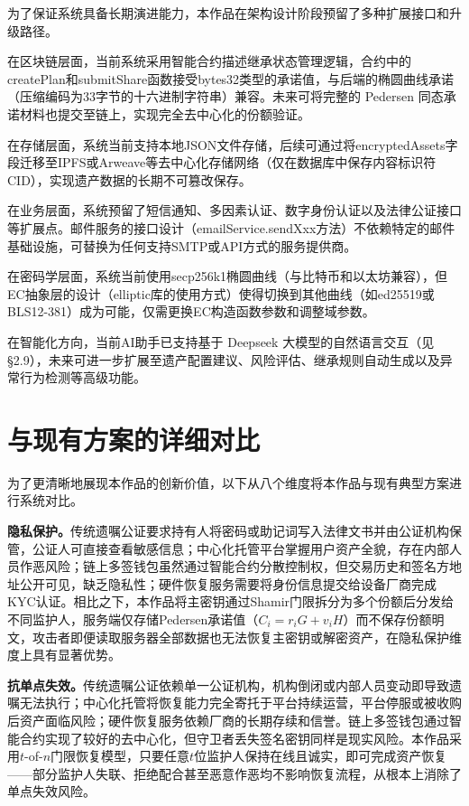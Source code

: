 \documentclass[UTF8,a4paper,zihao=-4,openany]{ctexrep}
\begin{document}
为了保证系统具备长期演进能力，本作品在架构设计阶段预留了多种扩展接口和升级路径。

在区块链层面，当前系统采用智能合约描述继承状态管理逻辑，合约中的createPlan和submitShare函数接受bytes32类型的承诺值，与后端的椭圆曲线承诺（压缩编码为33字节的十六进制字符串）兼容。未来可将完整的 Pedersen 同态承诺材料也提交至链上，实现完全去中心化的份额验证。

在存储层面，系统当前支持本地JSON文件存储，后续可通过将encryptedAssets字段迁移至IPFS或Arweave等去中心化存储网络（仅在数据库中保存内容标识符CID），实现遗产数据的长期不可篡改保存。

在业务层面，系统预留了短信通知、多因素认证、数字身份认证以及法律公证接口等扩展点。邮件服务的接口设计（emailService.sendXxx方法）不依赖特定的邮件基础设施，可替换为任何支持SMTP或API方式的服务提供商。

在密码学层面，系统当前使用secp256k1椭圆曲线（与比特币和以太坊兼容），但EC抽象层的设计（elliptic库的使用方式）使得切换到其他曲线（如ed25519或BLS12-381）成为可能，仅需更换EC构造函数参数和调整域参数。

在智能化方向，当前AI助手已支持基于 Deepseek 大模型的自然语言交互（见 §2.9），未来可进一步扩展至遗产配置建议、风险评估、继承规则自动生成以及异常行为检测等高级功能。

\section{与现有方案的详细对比}

为了更清晰地展现本作品的创新价值，以下从八个维度将本作品与现有典型方案进行系统对比。

\textbf{隐私保护。}传统遗嘱公证要求持有人将密码或助记词写入法律文书并由公证机构保管，公证人可直接查看敏感信息；中心化托管平台掌握用户资产全貌，存在内部人员作恶风险；链上多签钱包虽然通过智能合约分散控制权，但交易历史和签名方地址公开可见，缺乏隐私性；硬件恢复服务需要将身份信息提交给设备厂商完成KYC认证。相比之下，本作品将主密钥通过Shamir门限拆分为多个份额后分发给不同监护人，服务端仅存储Pedersen承诺值（$C_i = r_iG + v_iH$）而不保存份额明文，攻击者即便读取服务器全部数据也无法恢复主密钥或解密资产，在隐私保护维度上具有显著优势。

\textbf{抗单点失效。}传统遗嘱公证依赖单一公证机构，机构倒闭或内部人员变动即导致遗嘱无法执行；中心化托管将恢复能力完全寄托于平台持续运营，平台停服或被收购后资产面临风险；硬件恢复服务依赖厂商的长期存续和信誉。链上多签钱包通过智能合约实现了较好的去中心化，但守卫者丢失签名密钥同样是现实风险。本作品采用$t$-of-$n$门限恢复模型，只要任意$t$位监护人保持在线且诚实，即可完成资产恢复——部分监护人失联、拒绝配合甚至恶意作恶均不影响恢复流程，从根本上消除了单点失效风险。
\end{document}
